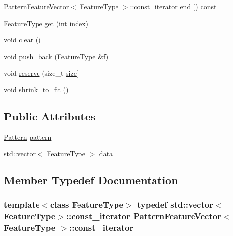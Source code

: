 \begin{DoxyCompactItemize}
\item 
\hyperlink{classPatternFeatureVector}{Pattern\+Feature\+Vector}$<$ Feature\+Type $>$\+::\hyperlink{classPatternFeatureVector_a8fae8bc79a755c241964080a684cfd43}{const\+\_\+iterator} \hyperlink{classPatternFeatureVector_a45060f620f3dc078de4faa22a8ef50b0}{end} () const 
\item 
Feature\+Type \hyperlink{classPatternFeatureVector_a82c7035fc558b218a8b971c82b5cda8b}{get} (int index)
\item 
void \hyperlink{classPatternFeatureVector_a3f49d8f1b798da5155b9e4c78129cf1b}{clear} ()
\item 
void \hyperlink{classPatternFeatureVector_ae69ed2f0d62ba0bf6977caaca4e96d25}{push\+\_\+back} (Feature\+Type \&f)
\item 
void \hyperlink{classPatternFeatureVector_a30756ee185cf6cdad80c9ab7fd381eec}{reserve} (size\+\_\+t \hyperlink{classPatternFeatureVector_ad99cf7876fda7bf9d7d41c8f0648df80}{size})
\item 
void \hyperlink{classPatternFeatureVector_af33c2dfca927f3bfe9a03444e0f9875d}{shrink\+\_\+to\+\_\+fit} ()
\end{DoxyCompactItemize}
\subsection*{Public Attributes}
\begin{DoxyCompactItemize}
\item 
\hyperlink{classPattern}{Pattern} \hyperlink{classPatternFeatureVector_ac4e2107b847e0b198de465ad81afd65a}{pattern}
\item 
std\+::vector$<$ Feature\+Type $>$ \hyperlink{classPatternFeatureVector_a82fb84a5b10f25a52375747a140fdf6a}{data}
\end{DoxyCompactItemize}


\subsection{Member Typedef Documentation}
\hypertarget{classPatternFeatureVector_a8fae8bc79a755c241964080a684cfd43}{}
\subsubsection[{const\+\_\+iterator}]{\setlength{\rightskip}{0pt plus 5cm}template$<$class Feature\+Type$>$ typedef std\+::vector$<$Feature\+Type$>$\+::{\bf const\+\_\+iterator} {\bf Pattern\+Feature\+Vector}$<$ Feature\+Type $>$\+::{\bf const\+\_\+iterator}}\label{classPatternFeatureVector_a8fae8bc79a755c241964080a684cfd43}
\hypertarget{classPatternFeatureVector_a4a2652f25b1f733630a6d1b8479fce77}{}

